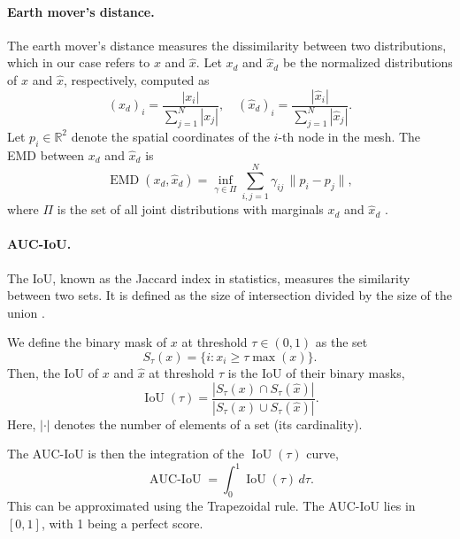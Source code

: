 \paragraph{Earth mover's distance.} The earth mover's distance measures the dissimilarity between two distributions, which in our case refers to $x$ and $\hat x$. Let $x_d$ and $\hat x_d$ be the normalized distributions of $x$ and $\hat x$, respectively, computed as
\begin{equation*}
    (x_d)_i = \frac{|x_i|}{\sum_{j=1}^N |x_j|}, \quad
    (\hat x_d)_i = \frac{|\hat x_i|}{\sum_{j=1}^N |\hat x_j|}.
\end{equation*}
Let $p_i \in \mathbb{R}^2$ denote the spatial coordinates of the $i$-th node in the mesh. The EMD between $x_d$ and $\hat x_d$ is
\begin{equation*}
    \operatorname{EMD}(x_d, \hat x_d) =
    \inf_{\gamma \in \Pi}
    \sum_{i,j=1}^N \gamma_{ij}\, \| p_i - p_j \|,
\end{equation*}
where $\Pi$ is the set of all joint distributions with marginals $x_d$ and $\hat x_d$ \cite{rubnerMetricDistributionsApplications1998}.


\paragraph{AUC-IoU.} The IoU, known as the Jaccard index in statistics, measures the similarity between two sets. It is defined as the size of intersection divided by the size of the union \cite{raschkaPythonMachineLearning}.

We define the binary mask of $x$ at threshold $\tau \in (0, 1)$ as the set
\begin{equation*}
    S_{\tau}(x) = \{ i : x_i \ge \tau \operatorname{max}(x) \}.
\end{equation*}
Then, the IoU of $x$ and $\hat x$ at threshold $\tau$ is the IoU of their binary masks,
\begin{equation*}
    \operatorname{IoU}(\tau) =
    \frac{|S_\tau(x) \cap S_\tau(\hat x)|}{|S_\tau(x) \cup S_\tau(\hat x)|}.
\end{equation*}
Here, $| \cdot |$ denotes the number of elements of a set (its cardinality).

The AUC-IoU is then the integration of the $\operatorname{IoU}(\tau)$ curve,
\begin{equation*}
    \operatorname{AUC-IoU} = \int_{0}^{1} \operatorname{IoU}(\tau) \, d\tau.
\end{equation*}
This can be approximated using the Trapezoidal rule. The AUC-IoU lies in $[0, 1]$, with 1 being a perfect score.